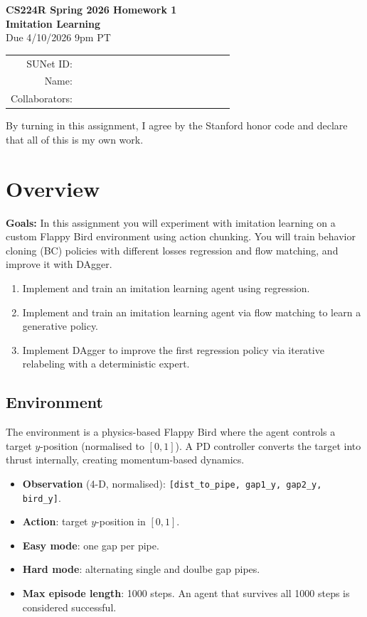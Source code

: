 \documentclass[12pt]{article}
\begin{document}
\begin{center}
{\Large \textbf{CS224R Spring 2026 Homework 1 \\ Imitation Learning}}
\\ {\large Due 4/10/2026 9pm PT}

\begin{tabular}{rl}
SUNet ID: & $\hspace{6cm}$\\
Name: & \\
Collaborators: & 
\end{tabular}
\end{center}

\noindent By turning in this assignment, I agree by the Stanford honor code and declare
that all of this is my own work. 

\section*{Overview}

\textbf{Goals:} In this assignment you will experiment with imitation learning on a custom Flappy Bird environment using action chunking. You will train behavior cloning (BC) policies with different losses regression and flow matching, and improve it with DAgger.

\begin{enumerate} 
    \item Implement and train an imitation learning agent using regression.
    \item Implement and train an imitation learning agent via flow matching to learn a generative policy.
    \item Implement DAgger to improve the first regression policy via iterative relabeling with a deterministic expert.
\end{enumerate}

\vspace{0.2cm}

\subsection*{Environment}

The environment is a physics-based Flappy Bird where the agent controls a target $y$-position (normalised to $[0, 1]$). A PD controller converts the target into thrust internally, creating momentum-based dynamics.

\begin{itemize}
    \item \textbf{Observation} (4-D, normalised): \texttt{[dist\_to\_pipe, gap1\_y, gap2\_y, bird\_y]}.
    \item \textbf{Action}: target $y$-position in $[0, 1]$.
    \item \textbf{Easy mode}: one gap per pipe.
    \item \textbf{Hard mode}: alternating single and doulbe gap pipes.
    \item \textbf{Max episode length}: 1000 steps. An agent that survives all 1000 steps is considered successful.
\end{itemize}
\end{document}
